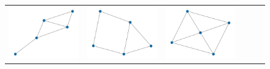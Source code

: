 \documentclass[11pt,a4paper,openright,oneside]{book}
\numberwithin{equation}{section}
\begin{document}
{\begin{figure}[h]
\begin{adjustwidth}{-3cm}{-3cm}
\begin{tabular}{>{\centering\arraybackslash}m{1.5cm} m{2.5cm} m{2.5cm} m{2.5cm} m{2.5cm} m{2.5cm}}
        \rule{0pt}{0.01cm} \includegraphics[width=\linewidth]{media/tnale/graph-1-tnale-2.png} \rule{0pt}{0.01cm}&
        \rule{0pt}{0.01cm} \includegraphics[width=\linewidth]{media/tnale/graph-2-tnale-2.png} \rule{0pt}{0.01cm}&
        \rule{0pt}{0.01cm} \includegraphics[width=\linewidth]{media/tnale/graph-3-tnale-2.png} \rule{0pt}{0.01cm}& 

\end{tabular}
\end{adjustwidth}
\end{figure}}
\end{document}
